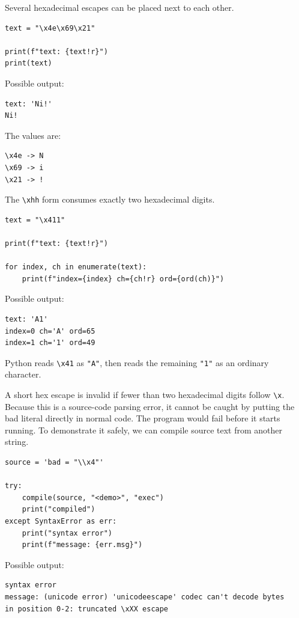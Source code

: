 Several hexadecimal escapes can be placed next to each other.

\begin{verbatim}
text = "\x4e\x69\x21"

print(f"text: {text!r}")
print(text)
\end{verbatim}

Possible output:

\begin{verbatim}
text: 'Ni!'
Ni!
\end{verbatim}

The values are:

\begin{verbatim}
\x4e -> N
\x69 -> i
\x21 -> !
\end{verbatim}

The \texttt{\textbackslash xhh} form consumes exactly two hexadecimal digits.

\begin{verbatim}
text = "\x411"

print(f"text: {text!r}")

for index, ch in enumerate(text):
    print(f"index={index} ch={ch!r} ord={ord(ch)}")
\end{verbatim}

Possible output:

\begin{verbatim}
text: 'A1'
index=0 ch='A' ord=65
index=1 ch='1' ord=49
\end{verbatim}

Python reads \texttt{\textbackslash x41} as \texttt{"A"}, then reads the remaining \texttt{"1"} as an ordinary character.

A short hex escape is invalid if fewer than two hexadecimal digits follow \texttt{\textbackslash x}. Because this is a source-code parsing error, it cannot be caught by putting the bad literal directly in normal code. The program would fail before it starts running. To demonstrate it safely, we can compile source text from another string.

\begin{verbatim}
source = 'bad = "\\x4"'

try:
    compile(source, "<demo>", "exec")
    print("compiled")
except SyntaxError as err:
    print("syntax error")
    print(f"message: {err.msg}")
\end{verbatim}

Possible output:

\begin{verbatim}
syntax error
message: (unicode error) 'unicodeescape' codec can't decode bytes
in position 0-2: truncated \xXX escape
\end{verbatim}


